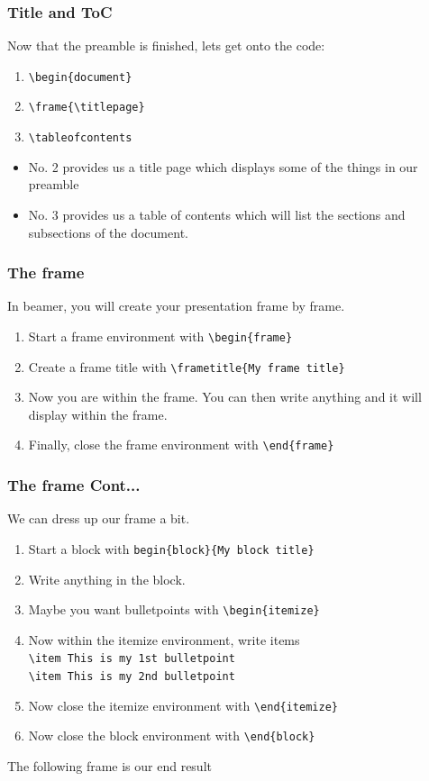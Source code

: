 \documentclass[nogin]{beamer}\usepackage[]{graphicx}\usepackage[]{color}
\begin{document}
\begin{frame}[fragile]
\frametitle{Title and ToC}
Now that the preamble is finished, lets get onto the code:
\begin{enumerate}
\item \verb|\begin{document}|
\item \verb|\frame{\titlepage}|
\item \verb|\tableofcontents|
\end{enumerate}
\begin{itemize}
\item No. 2 provides us a title page which displays some of the things in our preamble
\item No. 3 provides us a table of contents which will list the sections and subsections of the document.
\end{itemize}
\end{frame}

\begin{frame}[fragile]
\frametitle{The frame}
\footnotesize
In beamer, you will create your presentation frame by frame.
\begin{enumerate}
\item Start a frame environment with \verb|\begin{frame}|
\item Create a frame title with \verb|\frametitle{My frame title}|
\item Now you are within the frame. You can then write anything and it will display within the frame.
\item Finally, close the frame environment with \verb|\end{frame}|
\end{enumerate}
\end{frame}

\begin{frame}[fragile]
\frametitle{The frame Cont...}
\footnotesize
We can dress up our frame a bit.
\begin{enumerate}
\item Start a block with \verb|begin{block}{My block title}|
\item Write anything in the block.
\item Maybe you want bulletpoints with \verb|\begin{itemize}|
\item Now within the itemize environment, write items\\
\verb|\item This is my 1st bulletpoint|\\
\verb|\item This is my 2nd bulletpoint|\\
\item Now close the itemize environment with \verb|\end{itemize}|
\item Now close the block environment with \verb|\end{block}|
\end{enumerate}
The following frame is our end result
\end{frame}
\end{document}
